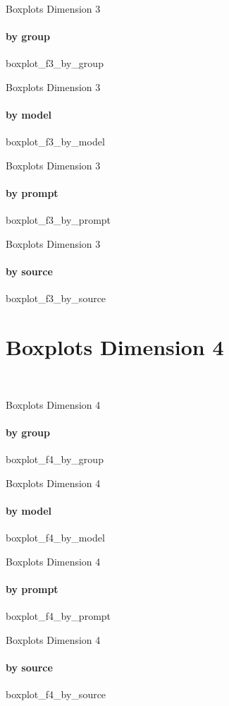 {\nologo
\begin{frame}{Boxplots Dimension 3}
    \framesubtitle{by group}
    {boxplot_f3_by_group}
\end{frame}
}

{\nologo
\begin{frame}{Boxplots Dimension 3}
    \framesubtitle{by model}
    {boxplot_f3_by_model}
\end{frame}
}

{\nologo
\begin{frame}{Boxplots Dimension 3}
    \framesubtitle{by prompt}
    {boxplot_f3_by_prompt}
\end{frame}
}

{\nologo
\begin{frame}{Boxplots Dimension 3}
    \framesubtitle{by source}
    {boxplot_f3_by_source}
\end{frame}
}

\section{Boxplots Dimension 4}

{\nologo
{}
\begin{frame}[c,plain]{}
    \vspace*{1cm}
    \centering
    \Huge
    \textcolor{white}{Boxplots Dimension 4}
\end{frame}
}

{\nologo
\begin{frame}{Boxplots Dimension 4}
    \framesubtitle{by group}
    {boxplot_f4_by_group}
\end{frame}
}

{\nologo
\begin{frame}{Boxplots Dimension 4}
    \framesubtitle{by model}
    {boxplot_f4_by_model}
\end{frame}
}

{\nologo
\begin{frame}{Boxplots Dimension 4}
    \framesubtitle{by prompt}
    {boxplot_f4_by_prompt}
\end{frame}
}

{\nologo
\begin{frame}{Boxplots Dimension 4}
    \framesubtitle{by source}
    {boxplot_f4_by_source}
\end{frame}
}

